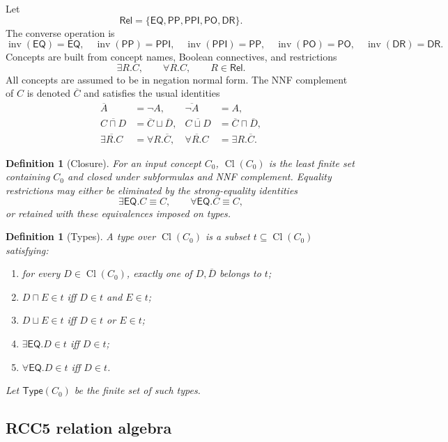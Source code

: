 \documentclass[11pt]{article}
\newtheorem{definition}[theorem]{Definition}
\newcommand{\Rel}{\mathsf{Rel}}
\newcommand{\EQ}{\mathsf{EQ}}
\newcommand{\PP}{\mathsf{PP}}
\newcommand{\PPI}{\mathsf{PPI}}
\newcommand{\PO}{\mathsf{PO}}
\newcommand{\DR}{\mathsf{DR}}
\newcommand{\Inv}{\operatorname{inv}}
\newcommand{\Cl}{\operatorname{Cl}}
\newcommand{\Typ}{\mathsf{Type}}
\begin{document}
Let
\[
  \Rel=\{\EQ,\PP,\PPI,\PO,\DR\}.
\]
The converse operation is
\[
\Inv(\EQ)=\EQ,
\quad
\Inv(\PP)=\PPI,
\quad
\Inv(\PPI)=\PP,
\quad
\Inv(\PO)=\PO,
\quad
\Inv(\DR)=\DR.
\]
Concepts are built from concept names, Boolean connectives, and restrictions
\[
  \exists R.C,
  \qquad
  \forall R.C,
  \qquad R\in\Rel.
\]
All concepts are assumed to be in negation normal form.  The NNF complement of $C$ is denoted $\overline C$ and satisfies the usual identities
\begin{align*}
\overline A&=\neg A,
&\overline{\neg A}&=A,\\
\overline{C\sqcap D}&=\overline C\sqcup\overline D,
&\overline{C\sqcup D}&=\overline C\sqcap\overline D,\\
\overline{\exists R.C}&=\forall R.\overline C,
&\overline{\forall R.C}&=\exists R.\overline C.
\end{align*}

\begin{definition}[Closure]
For an input concept $C_0$, $\Cl(C_0)$ is the least finite set containing $C_0$ and closed under subformulas and NNF complement.  Equality restrictions may either be eliminated by the strong-equality identities
\[
  \exists\EQ.C\equiv C,
  \qquad
  \forall\EQ.C\equiv C,
\]
or retained with these equivalences imposed on types.
\end{definition}

\begin{definition}[Types]
A type over $\Cl(C_0)$ is a subset $t\subseteq\Cl(C_0)$ satisfying:
\begin{enumerate}[label=(T\arabic*)]
\item for every $D\in\Cl(C_0)$, exactly one of $D,\overline D$ belongs to $t$;
\item $D\sqcap E\in t$ iff $D\in t$ and $E\in t$;
\item $D\sqcup E\in t$ iff $D\in t$ or $E\in t$;
\item $\exists\EQ.D\in t$ iff $D\in t$;
\item $\forall\EQ.D\in t$ iff $D\in t$.
\end{enumerate}
Let $\Typ(C_0)$ be the finite set of such types.
\end{definition}

\subsection{RCC5 relation algebra}
\end{document}

